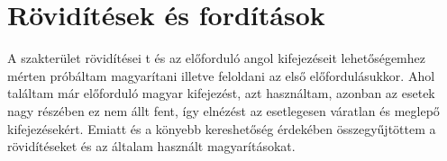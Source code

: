 \chapter*{Rövidítések és fordítások}
\label{sec:abbreviations}

A szakterület rövidítései
t és az előforduló angol kifejezéseit lehetőségemhez mérten  próbáltam magyarítani illetve feloldani az első előfordulásukkor.
Ahol találtam már előforduló magyar kifejezést, azt használtam, azonban az esetek nagy részében ez nem állt fent, így elnézést az esetlegesen váratlan és meglepő kifejezésekért.
Emiatt és a könyebb kereshetőség érdekében összegyűjtöttem a rövidítéseket és az általam használt magyarításokat.


